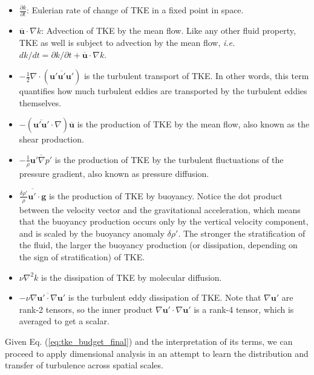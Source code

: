 \documentclass[12pt]{article}
\numberwithin{equation}{section}
\numberwithin{figure}{section}
\numberwithin{table}{section}
\begin{document}
\begin{itemize}
  \item $\frac{\partial k}{\partial t}$: Eulerian rate of change of TKE in
  a fixed point in space.

  \item $\overline{\mathbf{u}} \cdot \nabla k$: Advection of TKE by the mean
  flow. Like any other fluid property, TKE as well is subject to advection by
  the mean flow, \textit{i.e.} $dk/dt = \partial k/\partial t + \overline{\mathbf{u}} \cdot \nabla k$.

  \item $-\frac{1}{2} \nabla \cdot (\overline{\mathbf{u}' \mathbf{u}' \mathbf{u}'})$
  is the turbulent transport of TKE. In other words, this term quantifies how
  much turbulent eddies are transported by the turbulent eddies themselves.

  \item $-(\overline{\mathbf{u}' \mathbf{u}'} \cdot \nabla) \overline{\mathbf{u}}$ is the
  production of TKE by the mean flow, also known as the shear production.

  \item $-\frac{1}{\rho} \overline{\mathbf{u}' \nabla p'}$ is the
  production of TKE by the turbulent fluctuations of the pressure gradient,
  also known as pressure diffusion.

  \item $\overline{\frac{\delta \rho'}{\rho} \mathbf{u}' \cdot \mathbf{g}}$
  is the production of TKE by buoyancy. Notice the dot product between the
  velocity vector and the gravitational acceleration, which means that the
  buoyancy production occurs only by the vertical velocity component, and is
  scaled by the buoyancy anomaly $\delta \rho'$. The stronger the stratification
  of the fluid, the larger the buoyancy production (or dissipation, depending on
  the sign of stratification) of TKE.

  \item $\nu \nabla^2 k$ is the dissipation of TKE by molecular diffusion.

  \item $-\nu \overline{\nabla \mathbf{u}' \cdot \nabla \mathbf{u}'}$ is the 
  turbulent eddy dissipation of TKE. Note that $\nabla \mathbf{u}'$ are rank-2
  tensors, so the inner product $\nabla \mathbf{u}' \cdot \nabla \mathbf{u}'$
  is a rank-4 tensor, which is averaged to get a scalar.
\end{itemize}

Given Eq. (\ref{eq:tke_budget_final}) and the interpretation of its terms,
we can proceed to apply dimensional analysis in an attempt to learn the
distribution and transfer of turbulence across spatial scales.
\end{document}
